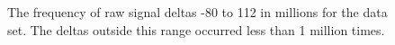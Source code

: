 \begin{figure}
	\centering

	\caption{\label{fig:delta-hist}The frequency of raw signal deltas -80 to 112 in millions for the data set. The deltas outside this range occurred less than 1 million times.}
\end{figure}
